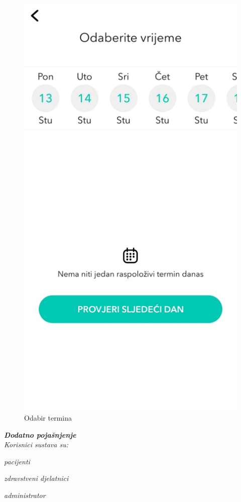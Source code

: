 		\begin{figure}[H]
			\includegraphics[scale=0.4]{slike/Buker-odabir-termina.PNG} %
			\centering
			\caption{Odabir termina}
			\label{fig:promjene}
		\end{figure}
		
		\textbf{\textit{Dodatno pojašnjenje}}\\
		
		\textit{Korisnici sustava su:}
		
		\begin{packed_item}
			\item \textit{pacijenti}
			\item \textit{zdravstveni djelatnici}
			\item \textit{administrator}
		\end{packed_item}
		

